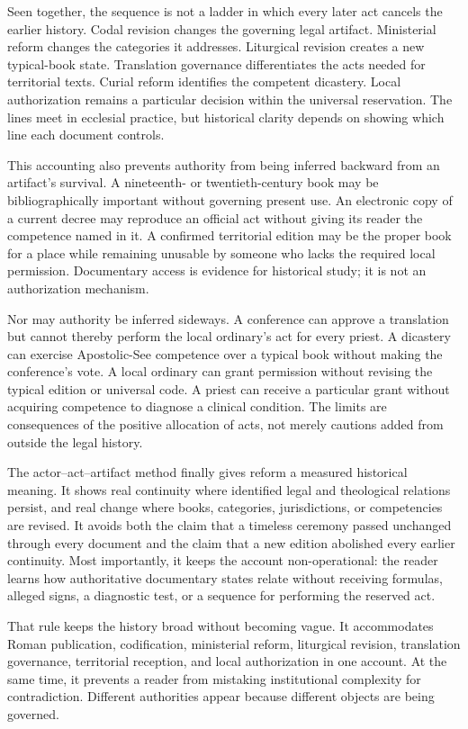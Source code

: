 Seen together, the sequence is not a ladder in which every later act cancels
the earlier history. Codal revision changes the governing legal artifact.
Ministerial reform changes the categories it addresses. Liturgical revision
creates a new typical-book state. Translation governance differentiates the
acts needed for territorial texts. Curial reform identifies the competent
dicastery. Local authorization remains a particular decision within the
universal reservation. The lines meet in ecclesial practice, but historical
clarity depends on showing which line each document controls.

This accounting also prevents authority from being inferred backward from an
artifact's survival. A nineteenth- or twentieth-century book may be
bibliographically important without governing present use. An electronic
copy of a current decree may reproduce an official act without giving its
reader the competence named in it. A confirmed territorial edition may be
the proper book for a place while remaining unusable by someone who lacks the
required local permission. Documentary access is evidence for historical
study; it is not an authorization mechanism.

Nor may authority be inferred sideways. A conference can approve a
translation but cannot thereby perform the local ordinary's act for every
priest. A dicastery can exercise Apostolic-See competence over a typical book
without making the conference's vote. A local ordinary can grant permission
without revising the typical edition or universal code. A priest can receive
a particular grant without acquiring competence to diagnose a clinical
condition. The limits are consequences of the positive allocation of acts,
not merely cautions added from outside the legal history.

The actor--act--artifact method finally gives reform a measured historical
meaning. It shows real continuity where identified legal and theological
relations persist, and real change where books, categories, jurisdictions, or
competencies are revised. It avoids both the claim that a timeless ceremony
passed unchanged through every document and the claim that a new edition
abolished every earlier continuity. Most importantly, it keeps the account
non-operational: the reader learns how authoritative documentary states
relate without receiving formulas, alleged signs, a diagnostic test, or a
sequence for performing the reserved act.

That rule keeps the history broad without becoming vague. It accommodates
Roman publication, codification, ministerial reform, liturgical revision,
translation governance, territorial reception, and local authorization in one
account. At the same time, it prevents a reader from mistaking institutional
complexity for contradiction. Different authorities appear because different
objects are being governed.

